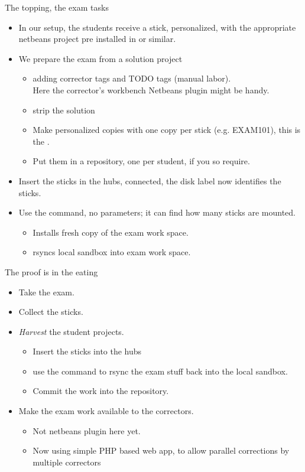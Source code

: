\begin{frame}{The topping, the exam tasks}
  \begin{itemize}
  \item In our setup, the students receive a stick, personalized, with
    the appropriate netbeans project pre installed in
     or similar.
  \item We prepare the exam from a solution project
    \begin{itemize}
    \item adding corrector tags and TODO tags (manual labor).\\
      Here the corrector's workbench Netbeans plugin might be handy.
    \item strip the solution
    \item Make personalized copies with one copy per stick
      (e.g. EXAM101), this is the .
    \item Put them in a repository, one per student, if you so require.
    \end{itemize}

  \item Insert the sticks in the hubs, connected, the disk label now identifies the sticks.
  \item Use the  command, no parameters; it can find
    how many sticks are mounted.
    \begin{itemize}
    \item Installs fresh copy of the exam work space.
    \item rsyncs local sandbox into exam work space.
    \end{itemize}
  \end{itemize}
\end{frame}

\begin{frame}{The proof is in the eating}
  \begin{itemize}
  \item Take the exam.
  \item Collect the sticks.
  \item \textit{Harvest} the student projects.
    \begin{itemize}
    \item Insert the sticks into the hubs
    \item use the command  to rsync the exam stuff
      back into the local sandbox.
    \item Commit the work into the repository.
    \end{itemize}
  \item Make the exam work available to the correctors.
    \begin{itemize}
    \item Not netbeans plugin here yet.
    \item Now using simple PHP based web app, to allow parallel
      corrections by multiple correctors
    \end{itemize}

  \end{itemize}
\end{frame}
